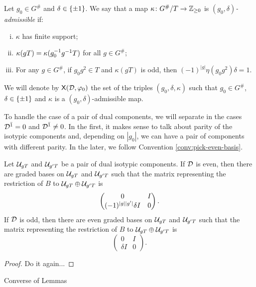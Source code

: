 \begin{defi}
    Let $g_0 \in G^\#$ and $\delta \in \{ \pm 1 \}$. 
    We say that a map $\kappa\colon G^\#/T \to \mathbb{Z}_{\geq 0}$ is \emph{$(g_0, \delta)$-admissible} if:
    \begin{enumerate}[(i)]
        \item $\kappa$ has finite support; \label{item:kappa-finite-support}
        \item $\kappa(gT) = \kappa(g_0^{-1} g^{-1} T)$ for all $g\in G^\#$; \label{item:kappa-duality}
        \item For any $g\in G^\#$, if $g_0 g^2 \in T$ and $\kappa (gT)$ is odd, then $(-1)^{|g|} \eta (g_0 g^2) \delta = 1$. \label{item:kappa-parity}
    \end{enumerate}
    We will denote by $\mathsf{X}(\mathcal{D}, \varphi_0)$ the set of the triples $(g_0, \delta, \kappa)$ such that $g_0\in G^\#$, $\delta \in \{ \pm 1 \}$ and $\kappa$ is a $(g_0, \delta)$-admissible map.
\end{defi}

To handle the case of a pair of dual components, we will separate in the cases $\mathcal{D}^{\bar1} = 0$ and $\mathcal{D}^{\bar1} \neq 0$. 
In the first, it makes sense to talk about parity of the isotypic components and, depending on $|g_0|$, we can have a pair of components with different parity. 
In the later, we follow Convention \ref{conv:pick-even-basis}.  

\begin{lemma}
    Let $\mathcal U_{gT}$ and $\mathcal U_{g'T}$ be a pair of dual isotypic components. 
    If $\mathcal{D}$ is even, then there are graded bases on $\mathcal U_{gT}$ and $\mathcal U_{g'T}$ such that the matrix representing the restriction of $B$ to $\mathcal U_{gT} \oplus \mathcal U_{g'T}$ is 
    \[\begin{pmatrix}
        0 & I\\
        (-1)^{|g||g'|} \delta I & 0
    \end{pmatrix}.\]
    If $\mathcal{D}$ is odd, then there are even graded bases on $\mathcal U_{gT}$ and $\mathcal U_{g'T}$ such that the matrix representing the restriction of $B$ to $\mathcal U_{gT} \oplus \mathcal U_{g'T}$ is 
    \[\begin{pmatrix}
        0 & I\\
        \delta I & 0
    \end{pmatrix}.\] 
\end{lemma}

\begin{proof}
    Do it again...
\end{proof}

\begin{prop}
    Converse of Lemmas
\end{prop}


